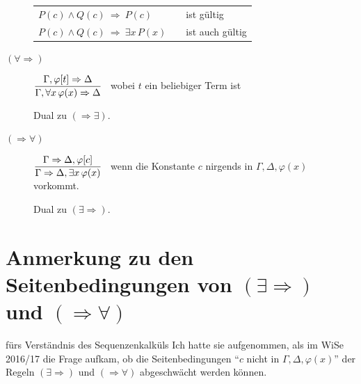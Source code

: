 \documentclass[fontsize=11pt, twoside=false, numbers=autoenddot]{scrbook}
\begin{document}
\begin{description}
\begin{center}
    \end{center}
    \par\medskip
    \begin{center}
      \begin{tabular}{l@{~}c@{\qquad}l@{}}
        $P(c) \land Q(c) ~\Rightarrow~ P(c)$            & & ist gültig \\[2pt]\cline{1-1}
        \rule{0pt}{12pt}%
        $P(c) \land Q(c) ~\Rightarrow~ \exists x\,P(x)$ & & ist auch gültig
      \end{tabular}
    \end{center}
    \par\bigskip
  \item[{\boldmath $(\forall\Rightarrow)$}]
    $
      \displaystyle
      \frac{\Gamma,\varphi[t] \Rightarrow \Delta}{\Gamma, \forall x \, \varphi(x) \Rightarrow \Delta}
    $
    ~wobei $t$ ein beliebiger Term ist
    ~\par\medskip
    Dual zu $(\Rightarrow\exists)$.
    \par\bigskip
  \item[{\boldmath $(\Rightarrow\forall)$}]
    $
      \displaystyle
      \frac{\Gamma \Rightarrow \Delta,\varphi[c]}{\Gamma \Rightarrow \Delta, \exists x \, \varphi(x) }
    $
    ~wenn die Konstante $c$ nirgends in $\Gamma,\Delta,\varphi(x)$ vorkommt.
    ~\par\medskip
    Dual zu $(\exists\Rightarrow)$.
\end{description}

\pagebreak
\section*{Anmerkung zu den Seitenbedingungen von {\boldmath $(\exists \Rightarrow)$ und $(\Rightarrow \forall)$}}

 fürs Verständnis des Sequenzenkalküls
Ich hatte sie aufgenommen, als im WiSe 2016/17 die Frage aufkam,
ob die Seitenbedingungen "`$c$ nicht in $\Gamma,\Delta,\varphi(x)$"'
der Regeln $(\exists \Rightarrow)$ und $(\Rightarrow \forall)$
abgeschwächt werden können.
\end{document}

